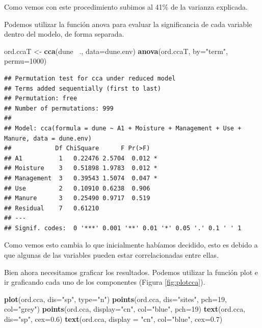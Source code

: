 \documentclass[]{book}
\newenvironment{Shaded}{\begin{snugshade}}{\end{snugshade}}
\newcommand{\KeywordTok}[1]{\textcolor[rgb]{0.13,0.29,0.53}{\textbf{{#1}}}}
\newcommand{\DataTypeTok}[1]{\textcolor[rgb]{0.13,0.29,0.53}{{#1}}}
\newcommand{\DecValTok}[1]{\textcolor[rgb]{0.00,0.00,0.81}{{#1}}}
\newcommand{\FloatTok}[1]{\textcolor[rgb]{0.00,0.00,0.81}{{#1}}}
\newcommand{\StringTok}[1]{\textcolor[rgb]{0.31,0.60,0.02}{{#1}}}
\newcommand{\NormalTok}[1]{{#1}}
\begin{document}
Como vemos con este procedimiento subimos al 41\% de la varianza
explicada.

Podemos utilizar la función anova para evaluar la significancia de cada
variable dentro del modelo, de forma separada.

\begin{Shaded}
\begin{Highlighting}[]
\NormalTok{ord.ccaT <-}\StringTok{ }\KeywordTok{cca}\NormalTok{(dune~}\StringTok{ }\NormalTok{., }\DataTypeTok{data=}\NormalTok{dune.env)}
\KeywordTok{anova}\NormalTok{(ord.ccaT, }\DataTypeTok{by=}\StringTok{"term"}\NormalTok{, }\DataTypeTok{permu=}\DecValTok{1000}\NormalTok{)}
\end{Highlighting}
\end{Shaded}

\begin{verbatim}
## Permutation test for cca under reduced model
## Terms added sequentially (first to last)
## Permutation: free
## Number of permutations: 999
## 
## Model: cca(formula = dune ~ A1 + Moisture + Management + Use + Manure, data = dune.env)
##            Df ChiSquare      F Pr(>F)  
## A1          1   0.22476 2.5704  0.012 *
## Moisture    3   0.51898 1.9783  0.012 *
## Management  3   0.39543 1.5074  0.047 *
## Use         2   0.10910 0.6238  0.906  
## Manure      3   0.25490 0.9717  0.519  
## Residual    7   0.61210                
## ---
## Signif. codes:  0 '***' 0.001 '**' 0.01 '*' 0.05 '.' 0.1 ' ' 1
\end{verbatim}

Como vemos esto cambia lo que inicialmente habíamos decidido, esto es
debido a que algunas de las variables pueden estar correlacionadas entre
ellas.

Bien ahora necesitamos graficar los resultados. Podemos utilizar la
función plot e ir graficando cada uno de los componentes (Figura
\ref{fig:plotcca}).

\begin{Shaded}
\begin{Highlighting}[]
\KeywordTok{plot}\NormalTok{(ord.cca, }\DataTypeTok{dis=}\StringTok{"sp"}\NormalTok{, }\DataTypeTok{type=}\StringTok{"n"}\NormalTok{)}
\KeywordTok{points}\NormalTok{(ord.cca, }\DataTypeTok{dis=}\StringTok{"sites"}\NormalTok{, }\DataTypeTok{pch=}\DecValTok{19}\NormalTok{, }\DataTypeTok{col=}\StringTok{"grey"}\NormalTok{)}
\KeywordTok{points}\NormalTok{(ord.cca, }\DataTypeTok{display=}\StringTok{"cn"}\NormalTok{, }\DataTypeTok{col=}\StringTok{"blue"}\NormalTok{, }\DataTypeTok{pch=}\DecValTok{19}\NormalTok{)}
\KeywordTok{text}\NormalTok{(ord.cca, }\DataTypeTok{dis=}\StringTok{"sp"}\NormalTok{, }\DataTypeTok{cex=}\FloatTok{0.6}\NormalTok{)}
\KeywordTok{text}\NormalTok{(ord.cca, }\DataTypeTok{display =} \StringTok{"cn"}\NormalTok{, }\DataTypeTok{col=}\StringTok{"blue"}\NormalTok{, }\DataTypeTok{cex=}\FloatTok{0.7}\NormalTok{)}
\end{Highlighting}
\end{Shaded}
\end{document}
